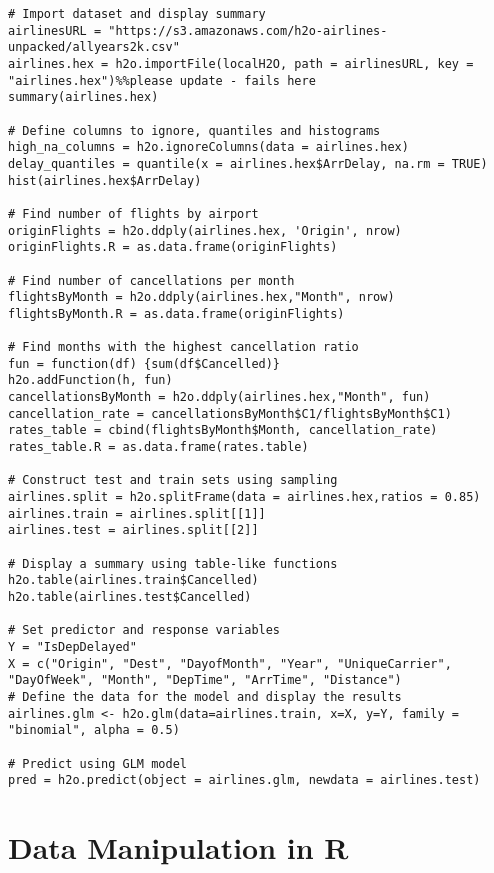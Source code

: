 \begin{lstlisting}[style=R]
# Import dataset and display summary
airlinesURL = "https://s3.amazonaws.com/h2o-airlines-unpacked/allyears2k.csv"
airlines.hex = h2o.importFile(localH2O, path = airlinesURL, key = "airlines.hex")%%please update - fails here
summary(airlines.hex)

# Define columns to ignore, quantiles and histograms
high_na_columns = h2o.ignoreColumns(data = airlines.hex)
delay_quantiles = quantile(x = airlines.hex$ArrDelay, na.rm = TRUE)
hist(airlines.hex$ArrDelay)

# Find number of flights by airport
originFlights = h2o.ddply(airlines.hex, 'Origin', nrow)
originFlights.R = as.data.frame(originFlights)

# Find number of cancellations per month
flightsByMonth = h2o.ddply(airlines.hex,"Month", nrow)
flightsByMonth.R = as.data.frame(originFlights)

# Find months with the highest cancellation ratio
fun = function(df) {sum(df$Cancelled)}
h2o.addFunction(h, fun)
cancellationsByMonth = h2o.ddply(airlines.hex,"Month", fun)
cancellation_rate = cancellationsByMonth$C1/flightsByMonth$C1)
rates_table = cbind(flightsByMonth$Month, cancellation_rate)
rates_table.R = as.data.frame(rates.table)

# Construct test and train sets using sampling
airlines.split = h2o.splitFrame(data = airlines.hex,ratios = 0.85)
airlines.train = airlines.split[[1]]
airlines.test = airlines.split[[2]]

# Display a summary using table-like functions
h2o.table(airlines.train$Cancelled)
h2o.table(airlines.test$Cancelled)

# Set predictor and response variables
Y = "IsDepDelayed"
X = c("Origin", "Dest", "DayofMonth", "Year", "UniqueCarrier", "DayOfWeek", "Month", "DepTime", "ArrTime", "Distance")
# Define the data for the model and display the results
airlines.glm <- h2o.glm(data=airlines.train, x=X, y=Y, family = "binomial", alpha = 0.5)

# Predict using GLM model
pred = h2o.predict(object = airlines.glm, newdata = airlines.test)

\end{lstlisting}




\section{Data Manipulation in R}


